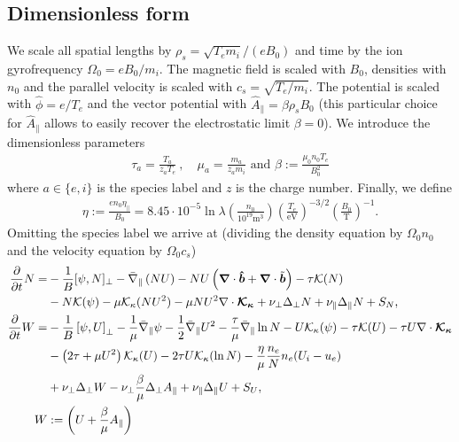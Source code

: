 \subsection{Dimensionless form}
We scale all spatial lengths by $\rho_s = \sqrt{T_e m_i}/(eB_0)$ and time by the ion gyrofrequency $\Omega_0 = eB_0/m_i$.
The magnetic field is scaled with $B_0$, densities with $n_0$ and the parallel velocity is scaled with $c_s = \sqrt{T_e/m_i}$.
The potential is scaled with $\hat \phi = e/T_e$ and the vector potential with 
$\hat A_\parallel = \beta \rho_s B_0$ (this particular choice for $\hat
A_\parallel$ allows to easily recover the electrostatic limit $\beta = 0$).
We introduce the dimensionless parameters
\begin{align}
  \tau_a = \frac{T_a}{z_aT_e}~,\quad \mu_a = \frac{m_a}{z_am_i}\text{ and } 
  \beta:=\frac{\mu_0 n_0 T_e}{B_0^2}
  \label{}
\end{align}
where $a\in\{e,i\}$ is the species label and $z$ is the charge number. Finally, we define
\begin{align}
  \eta:=\frac{en_0\eta_\parallel}{B_0} = 8.45\cdot 10^{-5}\ln \lambda \left(\frac{n_0}{10^{19}\text{m}^3}\right) \left(\frac{T_e}{\text{eV}}\right)^{-3/2} \left(\frac{B_0}{\text{T}}\right)^{-1}.
    \label{eq:resistivity}
\end{align}
Omitting the species label we arrive at (dividing the density equation by $\Omega_0n_0$ and the velocity equation by $\Omega_0 c_s$)
\begin{subequations}
    \begin{align}
    \frac{\partial}{\partial t} N =&
        - \frac{1}{B}[\psi, N]_{\perp}%
        - \bar \nabla_\parallel \left( NU\right)
        - NU\left(\vec \nabla\cdot\bhat+\vec \nabla\cdot\tilde{\vec b}\right)
        - \tau \mathcal K(N) \nonumber \\&
        - N \mathcal K(\psi)
        -\mu \mathcal K_\kappa(NU^2)
        -\mu NU^2\nabla\cdot \vec{ \mathcal K_\kappa}
        + \nu_\perp\Delta_\perp N + \nu_\parallel \Delta_\parallel N + S_N, \\
    \frac{\partial}{\partial t} W =&
        - \frac{1}{B}\left[\psi, U\right]_{\perp}%
        - \frac{1}{\mu} \bar \nabla_\parallel \psi%
        - \frac{1}{2}\bar \nabla_\parallel U^2
        -\frac{\tau}{\mu} \bar \nabla_\parallel \ln N
        - U\mathcal K_\kappa(\psi)
        - \tau \mathcal K(U)
        -\tau U\nabla\cdot\vec{ \mathcal K_\kappa}\nonumber\\&
        - \left(2\tau + {\mu}U^2\right) \mathcal K_\kappa (U)
        -2\tau U\mathcal K_\kappa(\ln N)
        - \frac{\eta}{\mu} \frac{n_e}{N}n_e(U_i - u_e) \nonumber\\&
        + \nu_\perp\Delta_\perp W
        - \nu_\perp\frac{\beta}{\mu}\Delta_\perp A_\parallel
        + \nu_\parallel \Delta_\parallel U + S_U,
        \label{eq:EgyrofluidU} \\
        W&:= \left( U + \frac{\beta}{\mu}A_\parallel\right)
    \end{align}
    \label{eq:Egyrofluid}
\end{subequations}
